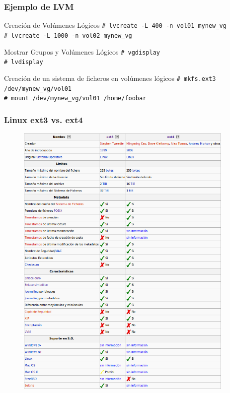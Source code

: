 \documentclass{beamer}
\begin{document}
\begin{frame}
  \frametitle{Ejemplo de LVM}

\begin{block}{Creación de Volúmenes Lógicos}
  \texttt{\# lvcreate -L 400 -n vol01 mynew\_vg } \\
  \texttt{\# lvcreate -L 1000 -n vol02 mynew\_vg }
\end{block}

\begin{block}{Mostrar Grupos y Volúmenes Lógicos}
  \texttt{\# vgdisplay } \\
  \texttt{\# lvdisplay }
\end{block}

\begin{block}{Creación de un sistema de ficheros en volúmenes lógicos}
  \texttt{\# mkfs.ext3 /dev/mynew\_vg/vol01} \\
  \texttt{\# mount /dev/mynew\_vg/vol01 /home/foobar}
\end{block}
\end{frame}

\begin{frame}
  \frametitle{Linux ext3 vs. ext4}
\begin{figure}[h]
\begin{center}
  \includegraphics[width=10.5cm]{figs/Tabla_ext3_ext4.png}
\end{center}
\end{figure}
\end{frame}
\end{document}
